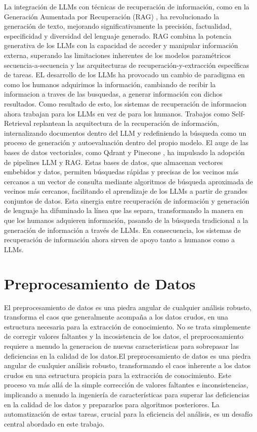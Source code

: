 La integración de LLMs con técnicas de recuperación de información, como en la Generación Aumentada por Recuperación (RAG) \cite{lewis2020retrieval}, ha revolucionado la generación de texto, mejorando significativamente la precisión, factualidad, especificidad y diversidad del lenguaje generado. RAG combina la potencia generativa de los LLMs con la capacidad de acceder y manipular información externa, superando las limitaciones inherentes de los modelos paramétricos secuencia-a-secuencia y las arquitecturas de recuperación-y-extracción específicas de tareas.
EL desarrollo de los LLMs ha provocado un cambio de paradigma en como los humanos adquirimos la información, cambiando de recibir la informacion a traves de las busquedas, a generar información con dichos resultados. Como resultado de esto, los sistemas de recuperación de informacion ahora trabajan para los LLMs en vez de para los humanos. Trabajos como Self-Retrieval \cite{tang2024self} replantean la arquitectura de la recuperación de información, internalizando documentos dentro del LLM y redefiniendo la búsqueda como un proceso de generación y autoevaluación dentro del propio modelo.
El auge de las bases de datos vectoriales, como Qdrant \cite{qdrant} y Pinecone \cite{pinecone}, ha impulsado la adopción de pipelines LLM y RAG. Estas bases de datos, que almacenan vectores embebidos y datos, permiten búsquedas rápidas y precisas de los vecinos más cercanos a un vector de consulta mediante algoritmos de búsqueda aproximada de vecinos más cercanos, facilitando el aprendizaje de los LLMs a partir de grandes conjuntos de datos. Esta sinergia entre recuperación de información y generación de lenguaje ha difuminado la línea que las separa, transformando la manera en que los humanos adquieren información, pasando de la búsqueda tradicional a la generación de información a través de LLMs. En consecuencia, los sistemas de recuperación de información ahora sirven de apoyo tanto a humanos como a LLMs. 

\section{Preprocesamiento de Datos}

El preprocesamiento de datos es una piedra angular de cualquier análisis robusto, transforma el caos que generalmente acompaña a los datos crudos, en una estructura necesaria para la extracción de conocimiento. No se trata simplemente de corregir valores faltantes y la incosistencia de los datos, el preprocesamiento requiere a menudo la generacion de nuevas caracteristicas para sobrepasar las deficiencias en la calidad de los datos.El preprocesamiento de datos es una piedra angular de cualquier análisis robusto, transformando el caos inherente a los datos crudos en una estructura propicia para la extracción de conocimiento. Este proceso va más allá de la simple corrección de valores faltantes e inconsistencias, implicando a menudo la ingeniería de características para superar las deficiencias en la calidad de los datos y prepararlos para algoritmos posteriores. La automatización de estas tareas, crucial para la eficiencia del análisis, es un desafío central abordado en este trabajo.

